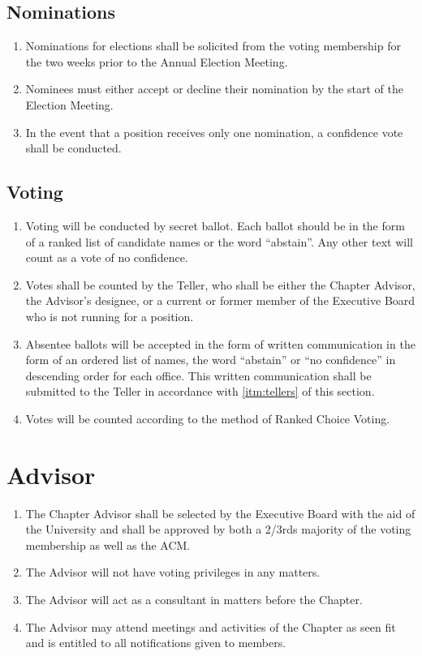 \documentclass[12pt, letterpaper, oneside]{book}
\begin{document}
\section{Nominations}
\begin{enumerate}
    \item Nominations for elections shall be solicited from the voting
        membership for the two weeks prior to the Annual Election Meeting.
    \item Nominees must either accept or decline their nomination by the start
        of the Election Meeting.
    \item In the event that a position receives only one nomination, a
        confidence vote shall be conducted.
\end{enumerate}

\section{Voting} \label{sec:voting}
\begin{enumerate}
    \item Voting will be conducted by secret ballot. Each ballot should be in
        the form of a ranked list of candidate names or the word ``abstain''.
        Any other text will count as a vote of no confidence.
    \item \label{itm:tellers} Votes shall be counted by the Teller, who shall be
        either the Chapter Advisor, the Advisor's designee, or a current or
        former member of the Executive Board who is not running for a position.
    \item Absentee ballots will be accepted in the form of written communication
        in the form of an ordered list of names, the word ``abstain'' or ``no
        confidence'' in descending order for each office. This written
        communication shall be submitted to the Teller in accordance with
        \cref{itm:tellers} of this section.
    \item Votes will be counted according to the method of Ranked Choice Voting.
\end{enumerate}

\chapter{Advisor}
\begin{enumerate}
    \item The Chapter Advisor shall be selected by the Executive Board with the
        aid of the University and shall be approved by both a 2/3rds majority of
        the voting membership as well as the ACM.
    \item The Advisor will not have voting privileges in any matters.
    \item The Advisor will act as a consultant in matters before the Chapter.
    \item The Advisor may attend meetings and activities of the Chapter as seen
        fit and is entitled to all notifications given to members.
\end{enumerate}
\end{document}
